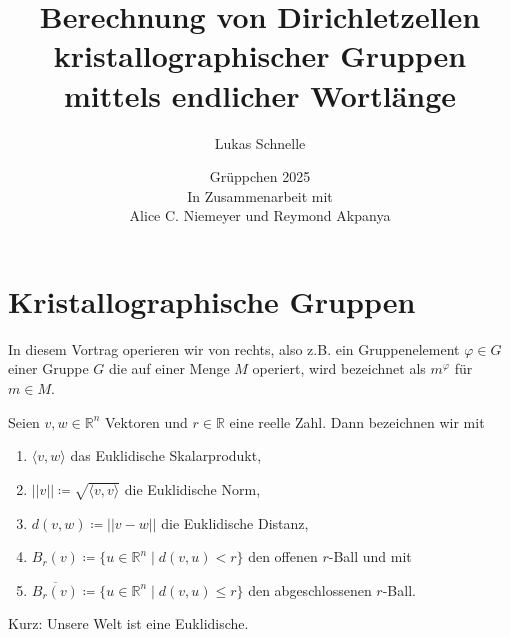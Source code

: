 \documentclass{beamer}
\title{Berechnung von Dirichletzellen kristallographischer Gruppen mittels endlicher Wortlänge }
\author{Lukas Schnelle}
\date{Grüppchen 2025 \\ In Zusammenarbeit mit \\Alice C. Niemeyer und Reymond Akpanya}
\theoremstyle{plain}
\newcommand\R{\mathbb R}
\renewcommand{\phi}{\varphi}
\begin{document}
\frame[plain]{\titlepage}

\section{Kristallographische Gruppen}
\begin{frame}
    In diesem Vortrag operieren wir von rechts, also z.B. ein Gruppenelement $\phi \in G$ einer Gruppe $G$ die auf einer Menge $M$ operiert, wird bezeichnet als $m^\phi$ für $m \in M$.
    \pause
    \begin{notation}
        Seien $v, w \in \R^n$ Vektoren und $r \in \R$ eine reelle Zahl. \pause 
        Dann bezeichnen wir mit 
        \begin{enumerate}[label=(\roman*)]
            \item $\langle v, w \rangle$ das Euklidische Skalarprodukt,\pause
            \item $||v|| \coloneqq \sqrt{\langle v, v \rangle}$ die Euklidische Norm,\pause
            \item $d(v, w) \coloneqq ||v - w ||$ die Euklidische Distanz,\pause
            \item $B_r(v) \coloneqq \{ u \in \R^n \mid d(v, u) < r \}$ den offenen $r$-Ball und mit \pause
            \item $\overline{B_r(v)} \coloneqq \{ u \in \R^n \mid d(v, u) \leq r \}$ den abgeschlossenen $r$-Ball. 
        \end{enumerate}  
    \end{notation}
    \pause
    Kurz: Unsere Welt ist eine Euklidische.

\end{frame}
\end{document}
